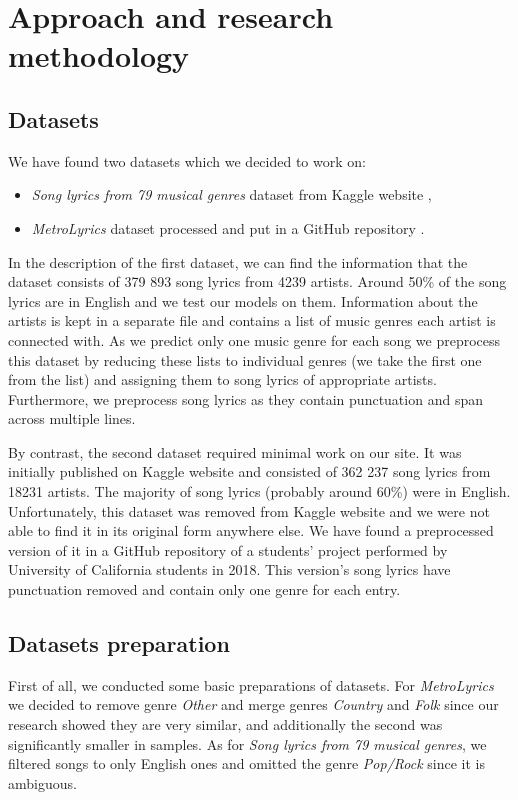 \section{Approach and research methodology}\label{approach}

\subsection{Datasets}\label{datasets}
We have found two datasets which we decided to work on:
\begin{itemize}
    \item \textit{Song lyrics from 79 musical genres} dataset from Kaggle website \cite{KaggleDataset},
    \item \textit{MetroLyrics} dataset processed and put in a GitHub repository \cite{GithubDataset}.
\end{itemize}

In the description of the first dataset, we can find the information that the dataset consists of 379 893 song lyrics from 4239 artists. Around 50\% of the song lyrics are in English and we test our models on them. Information about the artists is kept in a separate file and contains a list of music genres each artist is connected with. As we predict only one music genre for each song we preprocess this dataset by reducing these lists to individual genres (we take the first one from the list) and assigning them to song lyrics of appropriate artists. Furthermore, we preprocess song lyrics as they contain punctuation and span across multiple lines.

By contrast, the second dataset required minimal work on our site. It was initially published on Kaggle website and consisted of 362 237 song lyrics from 18231 artists. The majority of song lyrics (probably around 60\%) were in English. Unfortunately, this dataset was removed from Kaggle website and we were not able to find it in its original form anywhere else. We have found a preprocessed version of it in a GitHub repository of a students' project performed by University of California students in 2018. This version's song lyrics have punctuation removed and contain only one genre for each entry.

\subsection{Datasets preparation}\label{Datasets preparation}

First of all, we conducted some basic preparations of datasets.
For \textit{MetroLyrics} we decided to remove genre \textit{Other} and merge genres \textit{Country} and \textit{Folk} since  our research showed they are very similar, and additionally the second was significantly smaller in samples. As for \textit{Song lyrics from 79 musical genres}, we filtered songs to only English ones and omitted the genre \textit{Pop/Rock} since it is ambiguous.

